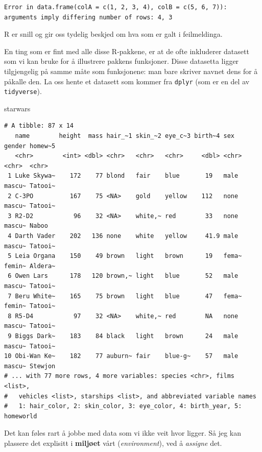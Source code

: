 \documentclass[
  letterpaper,
  DIV=11,
  numbers=noendperiod]{scrartcl}
\newenvironment{Shaded}{\begin{snugshade}}{\end{snugshade}}
\newcommand{\NormalTok}[1]{\textcolor[rgb]{0.00,0.23,0.31}{#1}}
\begin{document}
\begin{verbatim}
Error in data.frame(colA = c(1, 2, 3, 4), colB = c(5, 6, 7)): arguments imply differing number of rows: 4, 3
\end{verbatim}

R er snill og gir oss tydelig beskjed om hva som er galt i feilmeldinga.

En ting som er fint med alle disse R-pakkene, er at de ofte inkluderer
datasett som vi kan bruke for å illustrere pakkens funksjoner. Disse
datasetta ligger tilgjengelig på samme måte som funksjonene: man bare
skriver navnet dens for å påkalle den. La oss hente et datasett som
kommer fra \texttt{dplyr} (som er en del av \texttt{tidyverse}).

\begin{Shaded}
\begin{Highlighting}[]
\NormalTok{starwars}
\end{Highlighting}
\end{Shaded}

\begin{verbatim}
# A tibble: 87 x 14
   name        height  mass hair_~1 skin_~2 eye_c~3 birth~4 sex   gender homew~5
   <chr>        <int> <dbl> <chr>   <chr>   <chr>     <dbl> <chr> <chr>  <chr>  
 1 Luke Skywa~    172    77 blond   fair    blue       19   male  mascu~ Tatooi~
 2 C-3PO          167    75 <NA>    gold    yellow    112   none  mascu~ Tatooi~
 3 R2-D2           96    32 <NA>    white,~ red        33   none  mascu~ Naboo  
 4 Darth Vader    202   136 none    white   yellow     41.9 male  mascu~ Tatooi~
 5 Leia Organa    150    49 brown   light   brown      19   fema~ femin~ Aldera~
 6 Owen Lars      178   120 brown,~ light   blue       52   male  mascu~ Tatooi~
 7 Beru White~    165    75 brown   light   blue       47   fema~ femin~ Tatooi~
 8 R5-D4           97    32 <NA>    white,~ red        NA   none  mascu~ Tatooi~
 9 Biggs Dark~    183    84 black   light   brown      24   male  mascu~ Tatooi~
10 Obi-Wan Ke~    182    77 auburn~ fair    blue-g~    57   male  mascu~ Stewjon
# ... with 77 more rows, 4 more variables: species <chr>, films <list>,
#   vehicles <list>, starships <list>, and abbreviated variable names
#   1: hair_color, 2: skin_color, 3: eye_color, 4: birth_year, 5: homeworld
\end{verbatim}

Det kan føles rart å jobbe med data som vi ikke veit hvor ligger. Så jeg
kan plassere det explisitt i \textbf{miljøet} vårt (\emph{environment}),
ved å \emph{assigne} det.
\end{document}
